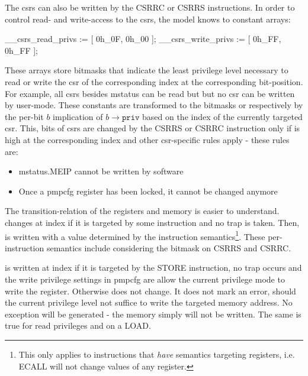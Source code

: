 The \glspl{csr} can also be written by the CSRRC or CSRRS instructions.
In order to control read- and write-access to the \glspl{csr}, the model knows to constant arrays:
\begin{smv}
__csrs_read_privs := [ 0h_0F, 0h_00 ];
__csrs_write_privs := [ 0h_FF, 0h_FF ];
\end{smv}

These arrays store bitmasks that indicate the least privilege level necessary to read or write the \gls{csr} of the corresponding index at the corresponding bit-position.
For example, all \glspl{csr} besides \gls{mstatus} can be read but but no \gls{csr} can be written by user-mode.
These constants are transformed to the bitmasks  or  respectively by the per-bit $ b $ implication of $ b \rightarrow \texttt{priv} $ based on the index of the currently targeted \gls{csr}.
This, bits of \glspl{csr} are changed by the CSRRS or CSRRC instruction only if  is high at the corresponding index and other \gls{csr}-specific rules apply - these rules are:
\begin{itemize}
    \item \gls{mstatus}.MEIP cannot be written by software
    \item Once a \gls{pmpcfg} register has been locked, it cannot be changed anymore
\end{itemize}

The transition-relation of the registers and memory is easier to understand.
 changes at index  if it is targeted by some instruction and no trap is taken.
Then,  is written with a value determined by the instruction semantics\footnote{%
    This only applies to instructions that \textit{have} semantics targeting registers, i.e. ECALL will not change values of any register.
}.
These per-instruction semantics include considering the  bitmask on CSRRS and CSRRC.

 is written at index  if it is targeted by the STORE instruction, no trap occurs and the write privilege settings in \gls{pmpcfg} are allow the current privilege mode to write the register.
Otherwise  does not change.
It does not mark an error, should the current privilege level not suffice to write the targeted memory address.
No exception will be generated - the memory simply will not be written.
The same is true for read privileges and  on a LOAD.

